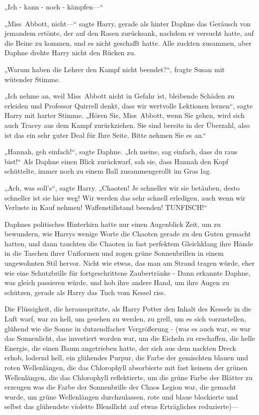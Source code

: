 {„Ich - kann - noch - kämpfen—“

„Miss~Abbott, nicht—“ sagte Harry, gerade als hinter Daphne das Geräusch von jemandem ertönte, der auf den Rasen zurücksank, nachdem er versucht hatte, auf die Beine zu kommen, und es nicht geschafft hatte. Alle zuckten zusammen, aber Daphne drehte Harry nicht den Rücken zu.

„Warum haben die Lehrer den Kampf nicht beendet?“, fragte Susan mit wütender Stimme.

„Ich nehme an, weil Miss~Abbott nicht in Gefahr ist, bleibende Schäden zu erleiden und Professor Quirrell denkt, dass wir wertvolle Lektionen lernen“, sagte Harry mit harter Stimme. „Hören Sie, Miss~Abbott, wenn Sie gehen, wird sich auch Tracey aus dem Kampf zurückziehen. Sie sind bereits in der Überzahl, also ist das ein sehr guter Deal für Ihre Seite. Bitte nehmen Sie es an.“

„Hannah, geh einfach!“, sagte Daphne. „Ich meine, sag einfach, dass du raus bist!“ Als Daphne einen Blick zurückwarf, sah sie, dass Hannah den Kopf schüttelte, immer noch zu einem Ball zusammengerollt im Gras lag.

„Ach, was soll's“, sagte Harry. „Chaoten! Je schneller wir sie betäuben, desto schneller ist sie hier weg! Wir werden das sehr schnell erledigen, auch wenn wir Verluste in Kauf nehmen! Waffenstillstand beenden! TUNFISCH!“

Daphnes politisches Hinterhirn hatte nur einen Augenblick Zeit, um zu bewundern, wie Harrys wenige Worte die Chaoten gerade zu den Guten gemacht hatten, und dann tauchten die Chaoten in fast perfektem Gleichklang ihre Hände in die Taschen ihrer Uniformen und zogen grüne Sonnenbrillen in einem ungewohnten Stil hervor. Nicht wie etwas, das man am Strand tragen würde, eher wie eine Schutzbrille für fortgeschrittene Zaubertränke - Dann erkannte Daphne, was gleich passieren würde, und hob ihre andere Hand, um ihre Augen zu schützen, gerade als Harry das Tuch vom Kessel riss.

Die Flüssigkeit, die herausspritzte, als Harry Potter den Inhalt des Kessels in die Luft warf, war zu hell, um gesehen zu werden, zu grell, um es sich vorzustellen, glühend wie die Sonne in dutzendfacher Vergrößerung - (was es auch war, es war das Sonnenlicht, das investiert worden war, um die Eicheln zu erschaffen, die helle Energie, die einen Baum angetrieben hatte, der sich aus dem nackten Dreck erhob, lodernd hell, ein glühendes Purpur, die Farbe der gemischten blauen und roten Wellenlängen, die das Chlorophyll absorbierte mit fast keinem der grünen Wellenlängen, die das Chlorophyll reflektierte, um die grüne Farbe der Blätter zu erzeugen was die Farbe der Sonnenbrille der Chaos Legion war, die gemacht wurde, um grüne Wellenlängen durchzulassen, rote und blaue blockierte und selbst das glühendste violette Blendlicht auf etwas Erträgliches reduzierte)—

}
